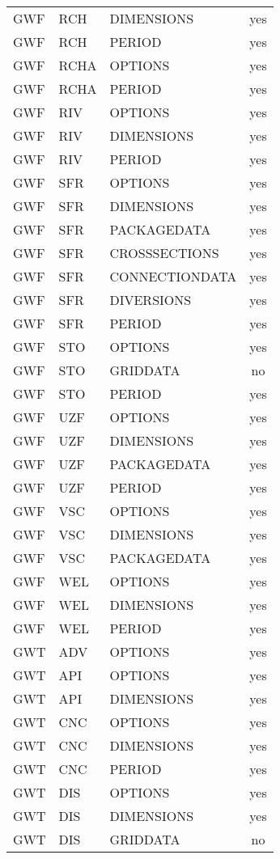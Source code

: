 \begin{longtable}{p{1.5cm} p{1.5cm} p{3cm} c}
GWF & RCH & DIMENSIONS & yes \\ 
GWF & RCH & PERIOD & yes \\ 
\hline
GWF & RCHA & OPTIONS & yes \\ 
GWF & RCHA & PERIOD & yes \\ 
\hline
GWF & RIV & OPTIONS & yes \\ 
GWF & RIV & DIMENSIONS & yes \\ 
GWF & RIV & PERIOD & yes \\ 
\hline
GWF & SFR & OPTIONS & yes \\ 
GWF & SFR & DIMENSIONS & yes \\ 
GWF & SFR & PACKAGEDATA & yes \\ 
GWF & SFR & CROSSSECTIONS & yes \\ 
GWF & SFR & CONNECTIONDATA & yes \\ 
GWF & SFR & DIVERSIONS & yes \\ 
GWF & SFR & PERIOD & yes \\ 
\hline
GWF & STO & OPTIONS & yes \\ 
GWF & STO & GRIDDATA & no \\ 
GWF & STO & PERIOD & yes \\ 
\hline
GWF & UZF & OPTIONS & yes \\ 
GWF & UZF & DIMENSIONS & yes \\ 
GWF & UZF & PACKAGEDATA & yes \\ 
GWF & UZF & PERIOD & yes \\ 
\hline
GWF & VSC & OPTIONS & yes \\ 
GWF & VSC & DIMENSIONS & yes \\ 
GWF & VSC & PACKAGEDATA & yes \\ 
\hline
GWF & WEL & OPTIONS & yes \\ 
GWF & WEL & DIMENSIONS & yes \\ 
GWF & WEL & PERIOD & yes \\ 
\hline
GWT & ADV & OPTIONS & yes \\ 
\hline
GWT & API & OPTIONS & yes \\ 
GWT & API & DIMENSIONS & yes \\ 
\hline
GWT & CNC & OPTIONS & yes \\ 
GWT & CNC & DIMENSIONS & yes \\ 
GWT & CNC & PERIOD & yes \\ 
\hline
GWT & DIS & OPTIONS & yes \\ 
GWT & DIS & DIMENSIONS & yes \\ 
GWT & DIS & GRIDDATA & no \\ 

\end{longtable}
